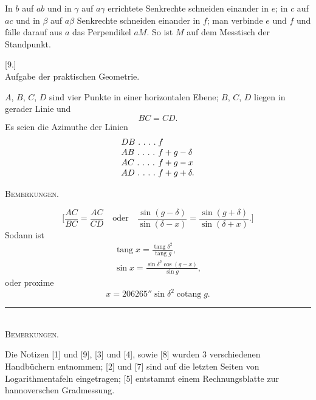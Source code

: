 In $b$ auf $ab$ und in $\gamma$ auf $a\gamma$ errichtete Senkrechte schneiden einander in $e$; in $c$ auf $ac$ und in $\beta$ auf $a\beta$ Senkrechte schneiden einander in $f$; man verbinde $e$ und $f$ und fälle darauf aus $a$ das Perpendikel $aM$. So ist $M$ auf dem Messtisch der Standpunkt.
\bigskip
\begin{center}[9.]\\[5pt]Aufgabe der praktischen Geometrie.\end{center}
$A$, $B$, $C$, $D$ sind vier Punkte in einer horizontalen Ebene; $B$, $C$, $D$ liegen in gerader Linie und
\[
BC=CD.
\]
Es seien die Azimuthe der Linien
\[
\begin{array}{l@{\;}l}
DB\ .\ .\ .\ .&f\\
AB\ .\ .\ .\ .&f+g-\delta\\
AC\ .\ .\ .\ .&f+g-x\\
AD\ .\ .\ .\ .&f+g+\delta.
\end{array}
\]
\begin{center}
\end{center}

\clearpage
{}\hfill\textsc{Bemerkungen.}\hfill\mbox{}\par\medskip
\[
\bigg[\frac{AC}{BC}=\frac{AC}{CD}\quad\text{oder}\quad
\frac{\sin(g-\delta)}{\sin(\delta-x)}=\frac{\sin(g+\delta)}{\sin(\delta+x)}.\bigg]
\]
Sodann ist
\[
\begin{gathered}
\operatorname{tang}x=\frac{\operatorname{tang}\delta^2}{\operatorname{tang}g},\\[6pt]
\sin x=\frac{\sin\delta^2\cos(g-x)}{\sin g},
\end{gathered}
\]
oder proxime
\[
x=206265''\sin\delta^2\operatorname{cotang}g.
\]
\bigskip
\begin{center}\rule{3cm}{.4pt}\\[6pt]\textsc{Bemerkungen.}\end{center}
\begingroup\footnotesize
Die Notizen [1] und [9], [3] und [4], sowie [8] wurden 3 verschiedenen Handbüchern entnommen; [2] und [7] sind auf die letzten Seiten von Logarithmentafeln eingetragen; [5] entstammt einem Rechnungsblatte zur hannoverschen Gradmessung.

